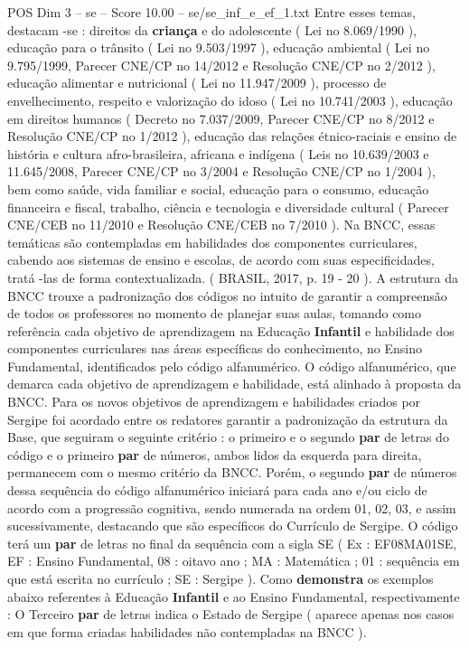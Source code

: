 \begin{textsample}{POS Dim 3 – se – Score 10.00 – se/se\_inf\_e\_ef\_1.txt}
Entre esses temas, destacam -se : direitos da \textbf{criança} e do adolescente ( Lei no 8.069/1990 ), educação para o trânsito ( Lei no 9.503/1997 ), educação ambiental ( Lei no 9.795/1999, Parecer CNE/CP no 14/2012 e Resolução CNE/CP no 2/2012 ), educação alimentar e nutricional ( Lei no 11.947/2009 ), processo de envelhecimento, respeito e valorização do idoso ( Lei no 10.741/2003 ), educação em direitos humanos ( Decreto no 7.037/2009, Parecer CNE/CP no 8/2012 e Resolução CNE/CP no 1/2012 ), educação das relações étnico-raciais e ensino de história e cultura afro-brasileira, africana e indígena ( Leis no 10.639/2003 e 11.645/2008, Parecer CNE/CP no 3/2004 e Resolução CNE/CP no 1/2004 ), bem como saúde, vida familiar e social, educação para o consumo, educação financeira e fiscal, trabalho, ciência e tecnologia e diversidade cultural ( Parecer CNE/CEB no 11/2010 e Resolução CNE/CEB no 7/2010 ).
Na BNCC, essas temáticas são contempladas em habilidades dos componentes curriculares, cabendo aos sistemas de ensino e escolas, de acordo com suas especificidades, tratá -las de forma contextualizada. ( BRASIL, 2017, p. 19 - 20 ).
A estrutura da BNCC trouxe a padronização dos códigos no intuito de garantir a compreensão de todos os professores no momento de planejar suas aulas, tomando como referência cada objetivo de aprendizagem na Educação \textbf{Infantil} e habilidade dos componentes curriculares nas áreas específicas do conhecimento, no Ensino Fundamental, identificados pelo código alfanumérico.
O código alfanumérico, que demarca cada objetivo de aprendizagem e habilidade, está alinhado à proposta da BNCC.
Para os novos objetivos de aprendizagem e habilidades criados por Sergipe foi acordado entre os redatores garantir a padronização da estrutura da Base, que seguiram o seguinte critério : o primeiro e o segundo \textbf{par} de letras do código e o primeiro \textbf{par} de números, ambos lidos da esquerda para direita, permanecem com o mesmo critério da BNCC.
Porém, o segundo \textbf{par} de números dessa sequência do código alfanumérico iniciará para cada ano e/ou ciclo de acordo com a progressão cognitiva, sendo numerada na ordem 01, 02, 03, e assim sucessivamente, destacando que são específicos do Currículo de Sergipe.
O código terá um \textbf{par} de letras no final da sequência com a sigla SE ( Ex : EF08MA01SE, EF : Ensino Fundamental, 08 : oitavo ano ; MA : Matemática ; 01 : sequência em que está escrita no currículo ; SE : Sergipe ).
Como \textbf{demonstra} os exemplos abaixo referentes à Educação \textbf{Infantil} e ao Ensino Fundamental, respectivamente : O Terceiro \textbf{par} de letras indica o Estado de Sergipe ( aparece apenas nos casos em que forma criadas habilidades não contempladas na BNCC ).

\end{textsample}
